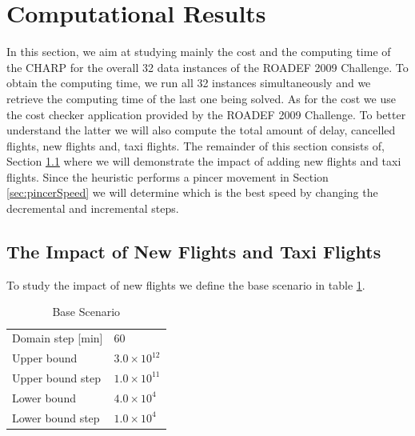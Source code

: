 \section{Computational Results}\label{sec:compResults}

In this section, we aim at studying mainly the cost and the computing time of the CHARP for the overall 32 data instances of the ROADEF 2009 Challenge. To obtain the computing time, we run all 32 instances simultaneously and we retrieve the computing time of the last one being solved. As for the cost we use the cost checker application provided by the ROADEF 2009 Challenge. To better understand the latter we will also compute the total amount of delay, cancelled flights, new flights and, taxi flights. The remainder of this section consists of, Section \ref{sec:impact} where we will demonstrate the impact of adding new flights and taxi flights. Since the heuristic performs a pincer movement in Section \ref{sec:pincerSpeed} we will determine which is the best speed by changing the decremental and incremental steps.\\
 


\subsection{The Impact of New Flights and Taxi Flights}\label{sec:impact}
To study the impact of new flights we define the base scenario in table \ref{tbl:baseScenario}. 

	\begin{table}[h!]
		\centering
		\caption{Base Scenario}
		\label{tbl:baseScenario}
		\begin{tabular}{ll}
			\hline
			Domain step {[}min{]} & 60                           \\
			Upper bound           & $3.0 \times 10^{12}$ \\
			Upper bound step      & $1.0 \times 10^{11}$ \\
			Lower bound           & $4.0 \times 10^4$ \\
			Lower bound step      & $1.0 \times 10^4$ \\
			\hline
		\end{tabular}
	\end{table}

